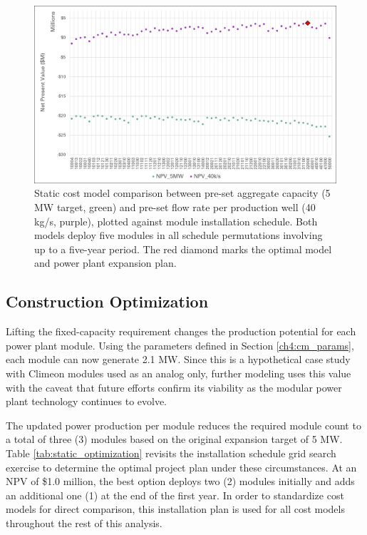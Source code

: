 \begin{figure}[!htp]
\centering
\includegraphics[width=.98\textwidth]
{templates/images/Figure-Static_Model_Construction.png}
\caption[Static cost model comparison]{Static cost model comparison between pre-set aggregate capacity (5 MW target, green) and pre-set flow rate per production well (40 kg/s, purple), plotted against module installation schedule. Both models deploy five modules in all schedule permutations involving up to a five-year period. The red diamond marks the optimal model and power plant expansion plan.}
\label{fig:static_model_compare}
\end{figure}

\subsection{Construction Optimization}\label{ch6:static_schedule}
Lifting the fixed-capacity requirement changes the production potential for each power plant module. Using the parameters defined in Section \ref{ch4:cm_params}, each module can now generate 2.1 MW. Since this is a hypothetical case study with Climeon modules used as an analog only, further modeling uses this value with the caveat that future efforts confirm its viability as the modular power plant technology continues to evolve.

The updated power production per module reduces the required module count to a total of three (3) modules based on the original expansion target of 5 MW. Table \ref{tab:static_optimization} revisits the installation schedule grid search exercise to determine the optimal project plan under these circumstances. At an NPV of \$1.0 million, the best option deploys two (2) modules initially and adds an additional one (1) at the end of the first year. In order to standardize cost models for direct comparison, this installation plan is used for all cost models throughout the rest of this analysis.

